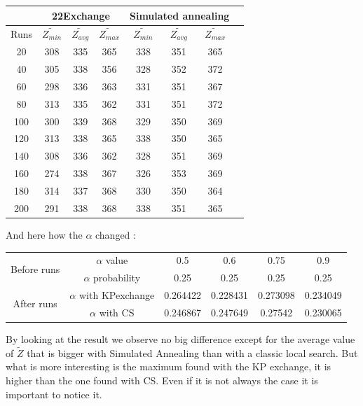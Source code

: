 \documentclass[12pt]{article}
\begin{document}
	\begin{center}
			\begin{tabular}{|c|c|c|c|c|c|c|c|}
				\hline
				&\multicolumn{3}{|c|}{22Exchange}& \multicolumn{3}{|c|}{Simulated annealing} \\
				\hline
				Runs& $\tilde{Z_{min }}$ & $\tilde{Z_{avg}}$ & $\tilde{Z_{max}}$ & $\tilde{Z_{min }}$ & $\tilde{Z_{avg}}$ & $\tilde{Z_{max}}$\\ 
				\hline
				20 & 308 & 335 & 365 & 338 & 351 & 365\\
				\hline
				40& 305 & 338 & 356 & 328 & 352 & 372\\
				\hline
				60& 298 & 336 & 363 & 331 & 351 & 367\\
				\hline
				80& 313 & 335 & 362 & 331 & 351 & 372\\
				\hline
				100& 300 & 339 & 368& 329 & 350 & 369\\
				\hline
				120& 313 & 338 & 365 & 338 & 350 & 365\\
				\hline
				140& 308 & 336 & 362 & 328 & 351 & 369\\
				\hline
				160& 274 & 338 & 367 & 326 & 353 & 369\\
				\hline
				180& 314 & 337 & 368& 330 & 350 & 364\\
				\hline
				200& 291 & 338 & 368& 338 & 351 & 365\\
				\hline
			\end{tabular}
	\end{center}
	And here how the $ \alpha $ changed :
	\begin{center}
		\begin{tabular}{|c|c|c|c|c|c|}
			\hline
			\multirow{2}{*}{Before runs} & $\alpha$ value &0.5 & 0.6 & 0.75 & 0.9 \\
			
			&$\alpha$ probability & 0.25 & 0.25 & 0.25 & 0.25  \\
			\hline
			\multirow{2}{*}{After runs} & $\alpha$ with KPexchange & 0.264422& 0.228431& 0.273098& 0.234049 \\
			
			&$\alpha$ with CS &0.246867& 0.247649& 0.27542& 0.230065 \\
			\hline
		\end{tabular}
	\end{center}
	By looking at the result we observe no big difference except for the average value of $ \tilde{Z} $ that is bigger with Simulated Annealing than with a classic local search. But what is more interesting is the maximum found with the KP exchange, it is higher than the one found with CS. Even if it is not always the case it is important to notice it.\\
	
\end{document}
